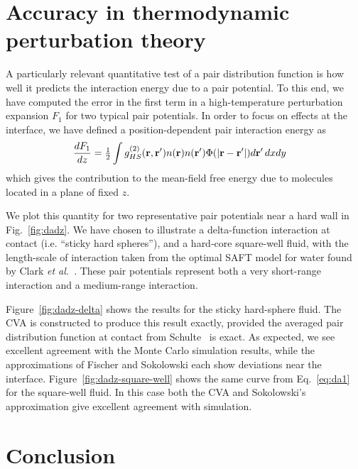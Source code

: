 \section{Accuracy in thermodynamic perturbation theory}

A particularly relevant quantitative test of a pair distribution
function is how well it predicts the interaction energy due to a pair
potential.  To this end, we have computed the error in the first term
in a high-temperature perturbation expansion $F_1$
for two typical pair potentials.  In order to focus on effects at the
interface, we have defined a position-dependent pair interaction
energy as
\begin{align}
  \frac{dF_1}{dz} &=
  \tfrac12 \int g^{(2)}_{HS}(\textbf{r},\textbf{r}')n(\textbf{r})n(\textbf{r}')\Phi(|\textbf{r}-\textbf{r}'|)
  d\textbf{r}'\, dxdy\label{eq:da1}
\end{align}
which gives the contribution to the mean-field free energy due to
molecules located in a plane of fixed $z$.

We plot this quantity for two representative pair potentials near a
hard wall in Fig.~\ref{fig:dadz}.  We have chosen to illustrate a
delta-function interaction at contact (i.e. ``sticky hard spheres''),
and a hard-core square-well fluid, with the length-scale of
interaction taken from the optimal SAFT model for water found by Clark
\emph{et al.}~\cite{clark2006developing}.  These pair potentials
represent both a very short-range interaction and a medium-range
interaction.

Figure~\ref{fig:dadz-delta} shows the results for the sticky
hard-sphere fluid.  The CVA is constructed to produce this result
exactly, provided the averaged pair distribution function at contact
from Schulte~\cite{schulte2012using} is exact.  As expected, we see
excellent agreement with the Monte Carlo simulation results, while the
approximations of Fischer and Sokolowski each show deviations near the
interface.  Figure~\ref{fig:dadz-square-well} shows the same curve
from Eq.~\ref{eq:da1} for the square-well fluid.  In this case both
the CVA and Sokolowski's approximation give excellent agreement with
simulation.

\section{Conclusion}

